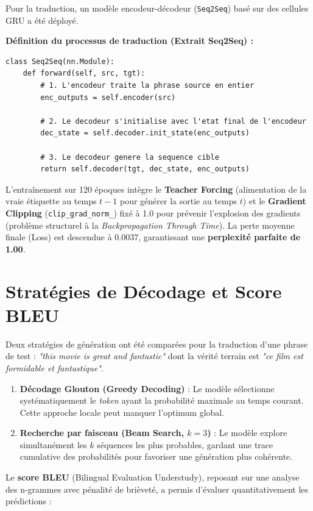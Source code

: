 Pour la traduction, un modèle encodeur-décodeur (\texttt{Seq2Seq}) basé sur des cellules GRU a été déployé. 

\textbf{Définition du processus de traduction (Extrait Seq2Seq) :}
\begin{verbatim}
class Seq2Seq(nn.Module):
    def forward(self, src, tgt):
        # 1. L'encodeur traite la phrase source en entier
        enc_outputs = self.encoder(src)
        
        # 2. Le decodeur s'initialise avec l'etat final de l'encodeur
        dec_state = self.decoder.init_state(enc_outputs)
        
        # 3. Le decodeur genere la sequence cible
        return self.decoder(tgt, dec_state, enc_outputs)
\end{verbatim}

L'entraînement sur 120 époques intègre le \textbf{Teacher Forcing} (alimentation de la vraie étiquette au temps $t-1$ pour générer la sortie au temps $t$) et le \textbf{Gradient Clipping} (\texttt{clip\_grad\_norm\_}) fixé à 1.0 pour prévenir l'explosion des gradients (problème structurel à la \textit{Backpropagation Through Time}). La perte moyenne finale (Loss) est descendue à 0.0037, garantissant une \textbf{perplexité parfaite de 1.00}.

\section{Stratégies de Décodage et Score BLEU}

Deux stratégies de génération ont été comparées pour la traduction d'une phrase de test : \textit{"this movie is great and fantastic"} dont la vérité terrain est \textit{"ce film est formidable et fantastique"}.

\begin{enumerate}
    \item \textbf{Décodage Glouton (Greedy Decoding)} : Le modèle sélectionne systématiquement le \textit{token} ayant la probabilité maximale au temps courant. Cette approche locale peut manquer l'optimum global.
    \item \textbf{Recherche par faisceau (Beam Search, $k=3$)} : Le modèle explore simultanément les $k$ séquences les plus probables, gardant une trace cumulative des probabilités pour favoriser une génération plus cohérente.
\end{enumerate}

Le \textbf{score BLEU} (Bilingual Evaluation Understudy), reposant sur une analyse des n-grammes avec pénalité de brièveté, a permis d'évaluer quantitativement les prédictions :

